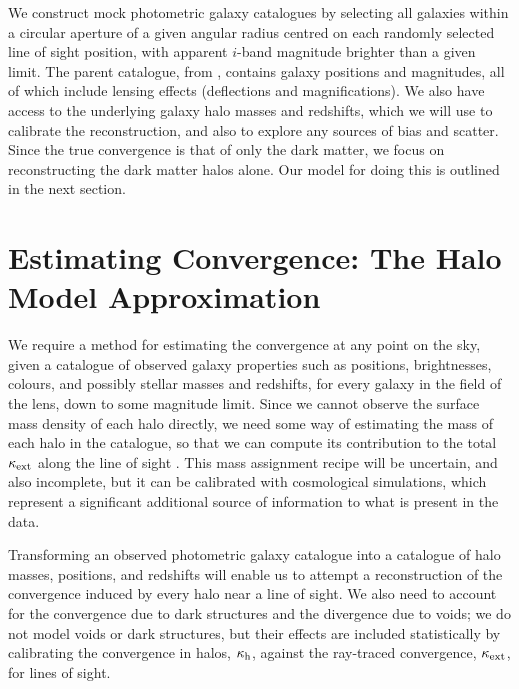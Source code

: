 \documentclass[useAMS,usenatbib,a4paper]{mn2e}
\begin{document}
We construct mock photometric galaxy catalogues by selecting all \MS galaxies
within a circular aperture of a given angular radius centred on each randomly
selected line of sight position, with apparent $i$-band magnitude brighter
than a given limit. The parent catalogue, from \citet{HilbertEtal2011},
contains galaxy positions and magnitudes, all of which include lensing effects
(deflections and magnifications). We also have access to the underlying galaxy
halo masses and redshifts, which we will use to calibrate the reconstruction,
and also to explore any sources of bias and scatter. Since the true
convergence is that of only the dark matter, we focus on reconstructing the
dark matter halos alone. Our model for doing this is outlined in the next
section. 


\section{Estimating Convergence: The Halo Model Approximation}
\label{sec:model}

We require a method for estimating the convergence at any point on the sky,
given a catalogue of observed galaxy properties such as positions,
brightnesses, colours, and possibly stellar masses and redshifts, for every
galaxy in the field of the lens, down to some magnitude limit. Since we cannot
observe the surface mass density of each halo directly, we need some way of
estimating the mass of each halo in the catalogue, so that we can compute its
contribution to the total $\kappa_{\rm ext}$ along the line of sight \citep[as in
\eg][]{GunnarssonEtal2006,WongEtal2011,KarpenkaEtal2012}.  This mass
assignment recipe will be uncertain, and also incomplete, but it can be
calibrated with cosmological simulations, which represent a significant
additional source of information to what is present in the data.

Transforming an observed photometric galaxy catalogue into a  catalogue of
halo masses, positions, and redshifts will enable us to attempt a
reconstruction of the convergence induced by every halo near a line of sight. 
We also need to account for the convergence due to dark structures and the
divergence due to voids; we do not model voids or dark structures, but their
effects are included statistically by calibrating the convergence in
halos, $\kappa_{\rm h}$, against the ray-traced convergence, $\kappa_{\rm ext}$, for \MS lines
of sight.
\end{document}
